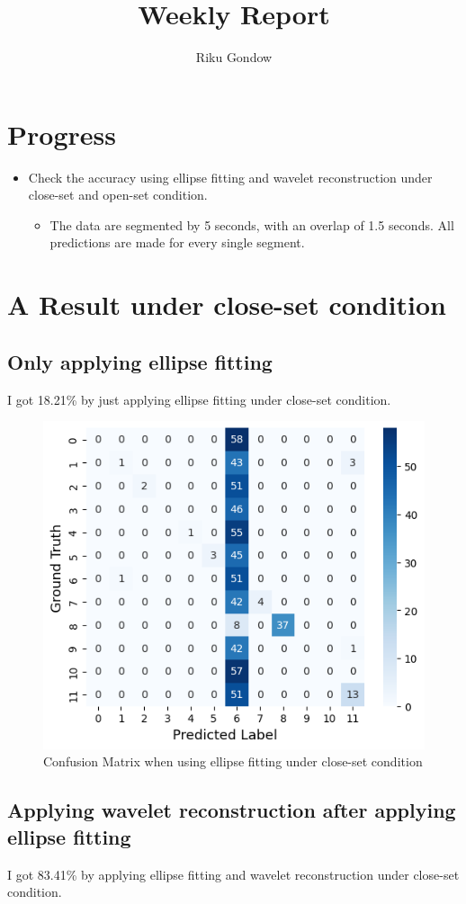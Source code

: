 \documentclass[dvipdfmx]{article}
\begin{document}
\title{Weekly Report}
\author{Riku Gondow}
\maketitle
\section{Progress}
\begin{itemize}
    \item Check the accuracy using ellipse fitting and wavelet reconstruction under close-set and open-set condition.
    \begin{itemize}
        \item The data are segmented by 5 seconds, with an overlap of 1.5 seconds. All predictions are made for every single segment.
    \end{itemize}
\end{itemize}
\section{A Result under close-set condition}
\subsection{Only applying ellipse fitting}
I got 18.21\% by just applying ellipse fitting under close-set condition.

\begin{figure}[H]
\begin{center}
\includegraphics[width=0.6\linewidth]{./img/el.png}
\end{center}
\caption{Confusion Matrix when using ellipse fitting under close-set condition}
\end{figure}

\subsection{Applying wavelet reconstruction after applying ellipse fitting}
I got 83.41\% by applying ellipse fitting and wavelet reconstruction under close-set condition.
\end{document}
